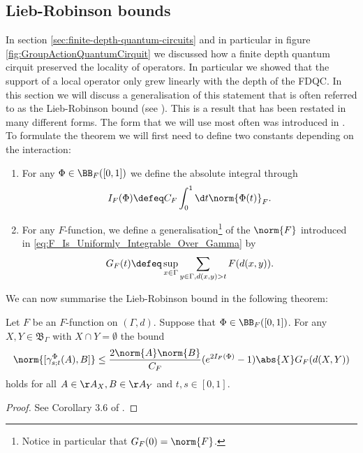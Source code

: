 \subsection{Lieb-Robinson bounds}
In section \ref{sec:finite-depth-quantum-circuits} and in particular in figure \ref{fig:GroupActionQuantumCirquit} we discussed how a finite depth quantum cirquit preserved the locality of operators. In particular we showed that the support of a local operator only grew linearly with the depth of the FDQC. In this section we will discuss a generalisation of this statement that is often referred to as the Lieb-Robinson bound (see \cite{Lieb:1972ts}). This is a result that has been restated in many different forms. The form that we will use most often was introduced in \cite{nachtergaele2019quasi}. To formulate the theorem we will first need to define two constants depending on the interaction:
\begin{enumerate}
	\item For any $\Phi\in\BB_F([0,1])$ we define the absolute integral through
	\begin{equation}
		I_F(\Phi)\defeq C_F\int_0^1 \d t \norm{\Phi(t)}_F.
	\end{equation}
	\item For any $F$-function, we define a generalisation\footnote{Notice in particular that $G_F(0)=\norm{F}$.} of the $\norm{F}$ introduced in \ref{eq:F_Is_Uniformly_Integrable_Over_Gamma} by
	\begin{equation}
		G_F(t)\defeq \sup_{x\in\Gamma}\sum_{y\in\Gamma,d(x,y)>t}F(d(x,y)).
	\end{equation}
\end{enumerate}
We can now summarise the Lieb-Robinson bound in the following theorem:
\begin{theorem}
	Let $F$ be an $F$-function on $(\Gamma,d)$. Suppose that $\Phi\in\BB_F([0,1])$. For any $X,Y\in\mathfrak{B}_\Gamma$ with $X\cap Y=\emptyset$ the bound
	\begin{equation}
		\norm{[\gamma_{s;t}^{\Phi}(A),B]}\leq \frac{2\norm{A}\norm{B}}{C_F}(e^{2I_F(\Phi)}-1)\abs{X}G_F(d(X,Y))
	\end{equation}
	holds for all $A\in\AA_X,B\in\AA_Y$ and $t,s\in[0,1]$.
\end{theorem}
\begin{proof}
	See Corollary 3.6 of \cite{nachtergaele2019quasi}.
\end{proof}
